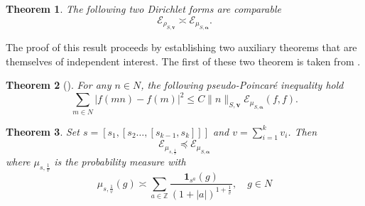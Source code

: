 \documentclass[pdflatex,sn-mathphys-num]{sn-jnl}%
\theoremstyle{thmstyleone}%
\newtheorem{theo}{Theorem}%
\theoremstyle{thmstyletwo}%
\theoremstyle{thmstylethree}%
\begin{document}
\begin{theo} 
\label{thm: rho_mu}
The following two Dirichlet forms are comparable
 $$\mathcal{E}_{\rho_{S,\mathbf v}} \asymp \mathcal{E}_{\mu_{S, \bm{\alpha}}}.$$
\end{theo}
The proof of this result proceeds by establishing two auxiliary theorems that are themselves of independent interest. The first of these two theorem is taken  from \cite{SCZ-nil}.
\begin{theo}[\cite{SCZ-nil,CKSCWZ1}] \label{thm: pp-inequality} For any $n \in N$,  the following pseudo-Poincar\'e inequality hold 
$$  \sum_{m\in N}|f(mn)-f(m)|^2\le C \|n\|_{S,\mathbf{v}} \mathcal E_{\mu_{S, \bm{\alpha}}}(f,f).$$
\end{theo} 
\begin{theo}
\label{theo: commu-dirichlet}
Set $s = [s_{1}, [s_{2} \ldots, [s_{k-1}, s_k]]]$ and  $ v =  \sum_{i=1}^k v_i
$. 
Then $$\mathcal{E}_{\mu_{s,\frac{1}{v}}} \preccurlyeq  \mathcal{E}_{\mu_{S,\bm{\alpha}}} $$
where 
$\mu_{s, \frac{1}{v}}$ is the probability measure with
$$\mu_{s,\frac{1}{v}}(g) \asymp \sum_{a\in \mathbb{Z}} \frac{\bm{1}_{s^a}(g)}{(1+|a|)^{1+\frac{1}{v}}}, \quad g\in N $$
\end{theo}
\end{document}
